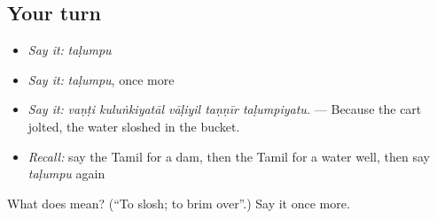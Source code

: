 \subsection*{Your turn}
\begin{itemize}
\raggedright
  \item \emph{Say it:} \emph{taḷumpu}
  \item \emph{Say it:} \emph{taḷumpu}, once more
  \item \emph{Say it:} \emph{vaṇṭi kuluṅkiyatāl vāḷiyil taṇṇīr taḷumpiyatu.} — Because the cart jolted, the water sloshed in the bucket.
  \item \emph{Recall:} say the Tamil for a dam, then the Tamil for a water well, then say \emph{taḷumpu} again
\end{itemize}

\begin{tcolorbox}[breakable,colback=teal!4,colframe=teal!35!black,title={Before you move on}]
What does  mean? (\textquotedblleft{}To slosh; to brim over\textquotedblright{}.) Say it once more.
\end{tcolorbox}
